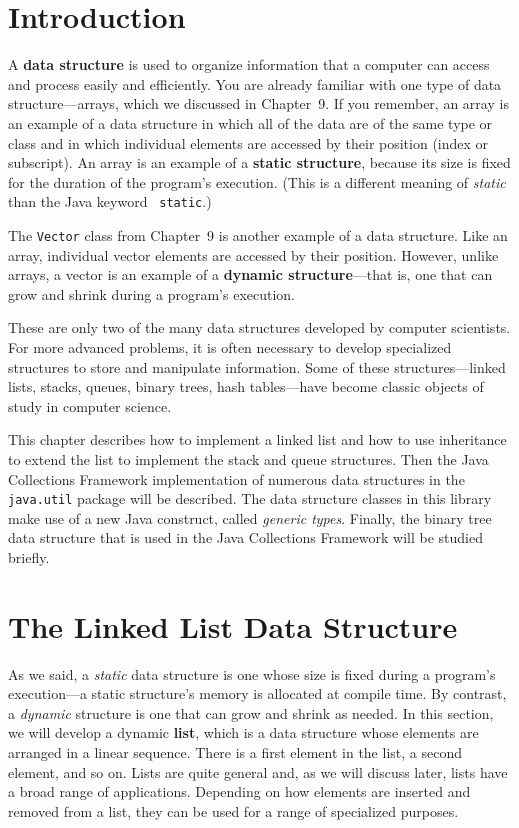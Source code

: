 \section{Introduction}
\noindent A {\bf data structure} is used to
organize information that a computer can access and process easily and
efficiently.  You are already familiar with one type of data
structure---arrays, which we discussed in Chapter~9.  If you remember,
an array is an example of a data structure in which all of the data
are of the same type or class and in which individual elements are
accessed by their position (index or subscript). An array is an
example of a {\bf static structure}, because
its size is fixed for the duration of the program's execution.  (This
is a different meaning of {\it static} than the Java keyword {\tt
static}.)

The {\tt Vector} class from Chapter~9 is another example
of a data structure.  Like an array, individual vector elements are
accessed by their position.  However, unlike arrays, a vector is an
example of a {\bf dynamic structure}---that
is, one that can grow and shrink during a program's execution.

These are only two of the many data structures developed by computer
scientists.   For more advanced problems, it is often necessary to
develop specialized structures to store and manipulate
information.  Some of these structures---linked lists, stacks,
queues, binary trees, hash tables---have become classic objects
of study in computer science.

This chapter describes how to implement a linked list and how to use
inheritance to extend the list to implement the stack and queue
structures. Then the Java Collections Framework implementation of
numerous data structures in the {\tt java.util} package will be
described.  The data structure classes in this library make use of a
new Java construct, called {\em generic types}.  Finally, the binary
tree data structure that is used in the Java Collections Framework
will be studied briefly.

\section{The Linked List Data Structure}
\noindent As we said, a {\it static} data structure is one whose size is fixed
during a program's execution---a static structure's memory is allocated at compile
time.  By contrast, a {\it dynamic} structure is one that can grow and
shrink as needed.  In this section, we will develop a dynamic {\bf
list}, which is a data structure whose elements are
arranged in a linear sequence.  There is a first element in the list,
a second element, and so on.  Lists are quite general and, as we will
discuss later, lists have a broad range of applications.  Depending on
how elements are inserted and removed from a list, they can be used
for a range of specialized purposes.

